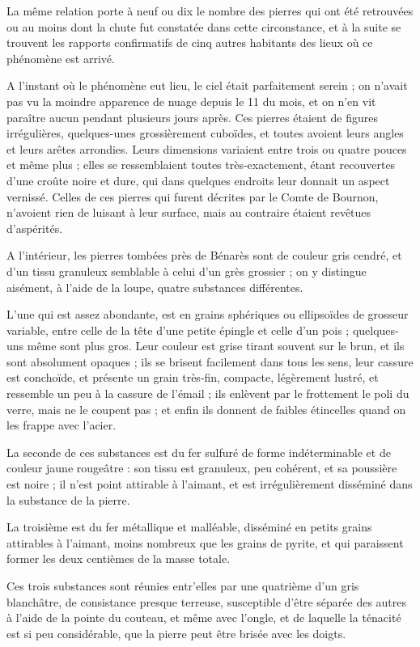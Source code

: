 \documentclass[a4paper, 12pt, oneside, french]{article}
\begin{document}
La même relation porte à neuf ou dix le nombre des pierres qui ont été retrouvées ou au moins dont la chute fut constatée dans cette circonstance, et à la suite se trouvent les rapports confirmatifs de cinq autres habitants des lieux où ce phénomène est arrivé.

A l'instant où le phénomène eut lieu, le ciel était parfaitement serein ; on n'avait pas vu la moindre apparence de nuage depuis le 11 du mois, et on n'en vit paraître aucun pendant plusieurs jours après. Ces pierres étaient de figures irrégulières, quelques-unes grossièrement cuboïdes, et toutes avoient leurs angles et leurs arêtes arrondies. Leurs dimensions variaient entre trois ou quatre pouces et même plus ; elles se ressemblaient toutes très-exactement, étant recouvertes d'une croûte noire et dure, qui dans quelques endroits leur donnait un aspect vernissé. Celles de ces pierres qui furent décrites par le Comte de Bournon, n'avoient rien de luisant à leur surface, mais au contraire étaient revêtues d'aspérités.

A l'intérieur, les pierres tombées près de Bénarès sont de couleur gris cendré, et d'un tissu granuleux semblable à celui d'un grès grossier ; on y distingue aisément, à l'aide de la loupe, quatre substances différentes.

L'une qui est assez abondante, est en grains sphériques ou ellipsoïdes de grosseur variable, entre celle de la tête d'une petite épingle et celle d'un pois ; quelques-uns même sont plus gros. Leur couleur est grise tirant souvent sur le brun, et ils sont absolument opaques ; ils se brisent facilement dans tous les sens, leur cassure est conchoïde, et présente un grain très-fin, compacte, légèrement lustré, et ressemble un peu à la cassure de l'émail ; ils enlèvent par le frottement le poli du verre, mais ne le coupent pas ; et enfin ils donnent de faibles étincelles quand on les frappe avec l'acier.

La seconde de ces substances est du fer sulfuré de forme indéterminable et de couleur jaune rougeâtre : son tissu est granuleux, peu cohérent, et sa poussière est noire ; il n'est point attirable à l'aimant, et est irrégulièrement disséminé dans la substance de la pierre.

La troisième est du fer métallique et malléable, disséminé en petits grains attirables à l'aimant, moins nombreux que les grains de pyrite, et qui paraissent former les deux centièmes de la masse totale.

Ces trois substances sont réunies entr'elles par une quatrième d'un gris blanchâtre, de consistance presque terreuse, susceptible d'être séparée des autres à l'aide de la pointe du couteau, et même avec l'ongle, et de laquelle la ténacité est si peu considérable, que la pierre peut être brisée avec les doigts.
\end{document}
